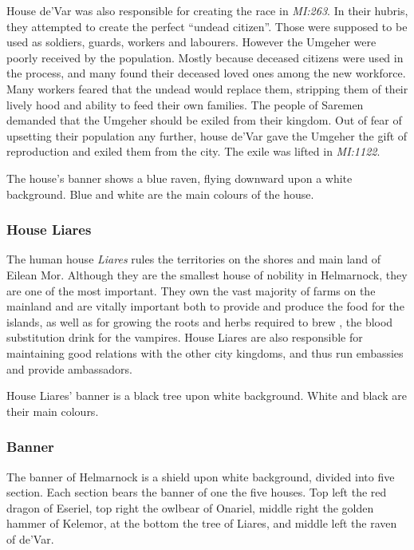 House de'Var was also responsible for creating the race 
in \emph{MI:263}. In their hubris, they attempted to create the perfect
``undead citizen''. Those were supposed to be used as soldiers, guards,
workers and labourers. However the Umgeher were poorly received by the
population. Mostly because deceased citizens were used in the process, and
many found their deceased loved ones among the new workforce. Many workers
feared that the undead would replace them, stripping them of their lively hood
and ability to feed their own families. The people of Saremen demanded that
the Umgeher should be exiled from their kingdom. Out of fear of upsetting
their population any further, house de'Var gave the Umgeher the gift of
reproduction and exiled them from the city. The exile was lifted in
\emph{MI:1122}.

The house's banner shows a blue raven, flying downward upon a white
background. Blue and white are the main colours of the house.

\subsubsection{House Liares}
\label{sec:House Liares}

The human house \emph{Liares} rules the territories on the shores and main
land of Eilean Mor. Although they are the smallest house of nobility in
Helmarnock, they are one of the most important. They own the vast majority of
farms on the mainland and are vitally important both to provide and produce
the food for the islands, as well as for growing the roots and herbs required
to brew , the blood substitution drink for the
vampires. House Liares are also responsible for maintaining good relations
with the other city kingdoms, and thus run embassies and provide ambassadors.

House Liares' banner is a black tree upon white background. White and black
are their main colours.

\subsubsection{Banner}

The banner of Helmarnock is a shield upon white background, divided into five
section. Each section bears the banner of one the five houses. Top left the
red dragon of Eseriel, top right the owlbear of Onariel, middle right the
golden hammer of Kelemor, at the bottom the tree of Liares, and middle left
the raven of de'Var.

